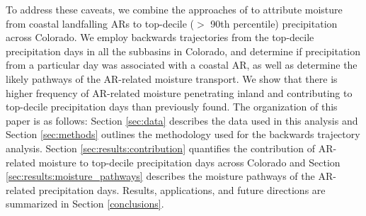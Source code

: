 \documentclass[draft]{agujournal2019}
\begin{document}
To address these caveats, we combine the approaches of  to attribute moisture from coastal landfalling ARs to top-decile ($>$ 90th percentile) precipitation across Colorado. We employ backwards trajectories from the top-decile precipitation days in all the subbasins in Colorado, and determine if precipitation from a particular day was associated with a coastal AR, as well as determine the likely pathways of the AR-related moisture transport. We show that there is higher frequency of AR-related moisture penetrating inland and contributing to top-decile precipitation days than previously found. The organization of this paper is as follows: Section \ref{sec:data} describes the data used in this analysis and Section \ref{sec:methods} outlines the methodology used for the backwards trajectory analysis. Section \ref{sec:results:contribution} quantifies the contribution of AR-related moisture to top-decile precipitation days across Colorado and Section \ref{sec:results:moisture_pathways} describes the moisture pathways of the AR-related precipitation days. Results, applications, and future directions are summarized in Section \ref{conclusions}. 


\end{document}
